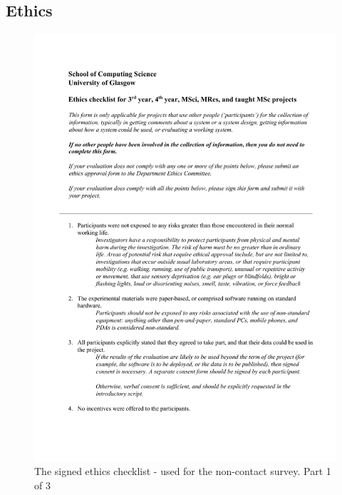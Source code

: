 \documentclass{l4proj}
\begin{document}
\begin{appendices}

    \chapter{Ethics}

    \begin{figure}[!htb]
        \centering
        \includegraphics[width=0.8\linewidth]{images/ethics_checklist_signed 1.pdf}

        \caption{ The signed ethics checklist - used for the non-contact survey. Part 1 of 3 }

        \label{fig:ethics_checklist1}
    \end{figure}


\end{appendices}
\end{document}

